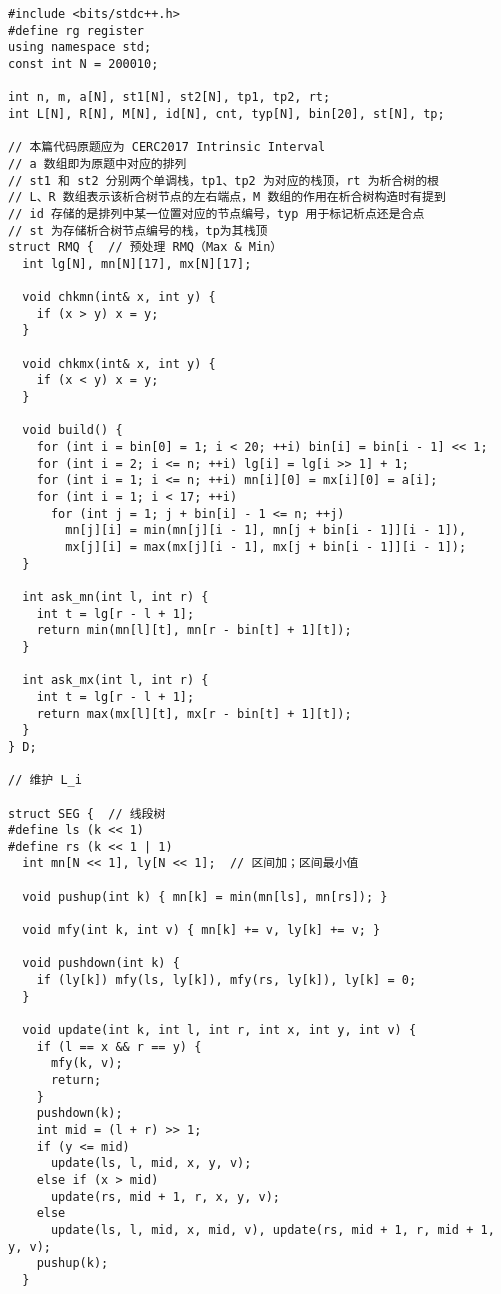 \documentclass[12pt]{ctexart}
\begin{document}
\begin{lstlisting}
#include <bits/stdc++.h>
#define rg register
using namespace std;
const int N = 200010;

int n, m, a[N], st1[N], st2[N], tp1, tp2, rt;
int L[N], R[N], M[N], id[N], cnt, typ[N], bin[20], st[N], tp;

// 本篇代码原题应为 CERC2017 Intrinsic Interval
// a 数组即为原题中对应的排列
// st1 和 st2 分别两个单调栈，tp1、tp2 为对应的栈顶，rt 为析合树的根
// L、R 数组表示该析合树节点的左右端点，M 数组的作用在析合树构造时有提到
// id 存储的是排列中某一位置对应的节点编号，typ 用于标记析点还是合点
// st 为存储析合树节点编号的栈，tp为其栈顶
struct RMQ {  // 预处理 RMQ（Max & Min）
  int lg[N], mn[N][17], mx[N][17];

  void chkmn(int& x, int y) {
    if (x > y) x = y;
  }

  void chkmx(int& x, int y) {
    if (x < y) x = y;
  }

  void build() {
    for (int i = bin[0] = 1; i < 20; ++i) bin[i] = bin[i - 1] << 1;
    for (int i = 2; i <= n; ++i) lg[i] = lg[i >> 1] + 1;
    for (int i = 1; i <= n; ++i) mn[i][0] = mx[i][0] = a[i];
    for (int i = 1; i < 17; ++i)
      for (int j = 1; j + bin[i] - 1 <= n; ++j)
        mn[j][i] = min(mn[j][i - 1], mn[j + bin[i - 1]][i - 1]),
        mx[j][i] = max(mx[j][i - 1], mx[j + bin[i - 1]][i - 1]);
  }

  int ask_mn(int l, int r) {
    int t = lg[r - l + 1];
    return min(mn[l][t], mn[r - bin[t] + 1][t]);
  }

  int ask_mx(int l, int r) {
    int t = lg[r - l + 1];
    return max(mx[l][t], mx[r - bin[t] + 1][t]);
  }
} D;

// 维护 L_i

struct SEG {  // 线段树
#define ls (k << 1)
#define rs (k << 1 | 1)
  int mn[N << 1], ly[N << 1];  // 区间加；区间最小值

  void pushup(int k) { mn[k] = min(mn[ls], mn[rs]); }

  void mfy(int k, int v) { mn[k] += v, ly[k] += v; }

  void pushdown(int k) {
    if (ly[k]) mfy(ls, ly[k]), mfy(rs, ly[k]), ly[k] = 0;
  }

  void update(int k, int l, int r, int x, int y, int v) {
    if (l == x && r == y) {
      mfy(k, v);
      return;
    }
    pushdown(k);
    int mid = (l + r) >> 1;
    if (y <= mid)
      update(ls, l, mid, x, y, v);
    else if (x > mid)
      update(rs, mid + 1, r, x, y, v);
    else
      update(ls, l, mid, x, mid, v), update(rs, mid + 1, r, mid + 1, y, v);
    pushup(k);
  }


\end{lstlisting}
\end{document}
